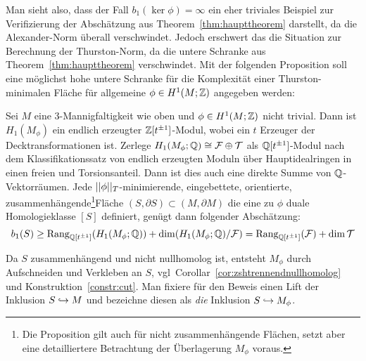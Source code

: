     Man sieht also, dass der Fall $b_1(\ker\phi)=\infty$ ein eher triviales Beispiel zur Verifizierung der Abschätzung aus Theorem~\ref{thm:haupttheorem} darstellt, da die Alexander-Norm überall verschwindet. Jedoch erschwert das die Situation zur Berechnung der Thurston-Norm, da die untere Schranke aus Theorem~\ref{thm:haupttheorem} verschwindet. Mit der folgenden Proposition soll eine möglichst hohe untere Schranke für die Komplexität einer Thurston-minimalen Fläche für allgemeine $\phi\in H^1(M;\mathbb{Z})$ angegeben werden:

    \begin{prop}
        Sei $M$ eine 3-Mannigfaltigkeit wie oben und $\phi \in H^1(M;\mathbb{Z})$ nicht trivial. Dann ist $H_1(M_\phi)$ ein endlich erzeugter $\mathbb{Z}[t^{\pm 1}]$-Modul, wobei ein $t$ Erzeuger der Decktransformationen ist.
        Zerlege $H_1(M_\phi;\mathbb{Q})\cong \mathcal{F} \oplus \mathcal{T}$ als $\mathbb{Q}[t^{\pm 1}]$-Modul nach dem Klassifikationssatz von endlich erzeugten Moduln über Hauptidealringen in einen freien und Torsionsanteil. Dann ist dies auch eine direkte Summe von $\mathbb{Q}$-Vektorräumen. Jede $||\phi||_T$-minimierende, eingebettete, orientierte, zusammenhängende\footnote{Die Proposition gilt auch für nicht zusammenhängende Flächen, setzt aber eine detailliertere Betrachtung der Überlagerung $M_\phi$ voraus.}Fläche $(S,\partial S) \subset (M,\partial M)$ die eine zu $\phi$ duale Homologieklasse $[S]$ definiert, genügt dann folgender Abschätzung:
            \[
                b_1(S) \geq  \operatorname{Rang}_{\mathbb{Q}[t^{\pm 1}]}(H_1(M_\phi;\mathbb{Q})) + \dim(H_1(M_\phi;\mathbb{Q})/\mathcal F) = \operatorname{Rang}_{\mathbb{Q}[t^{\pm 1}]} (\mathcal F) + \dim \mathcal T
            \]
    \end{prop}
        Da $S$ zusammenhängend und nicht nullhomolog ist, entsteht $M_\phi$ durch Aufschneiden und Verkleben an $S$, vgl\ Corollar~\ref{cor:zshtrennendnullhomolog} und Konstruktion~\ref{constr:cut}. Man fixiere für den Beweis einen Lift der Inklusion $S\hookrightarrow M$ und bezeichne diesen als \emph{die} Inklusion $S\hookrightarrow M_\phi$.
